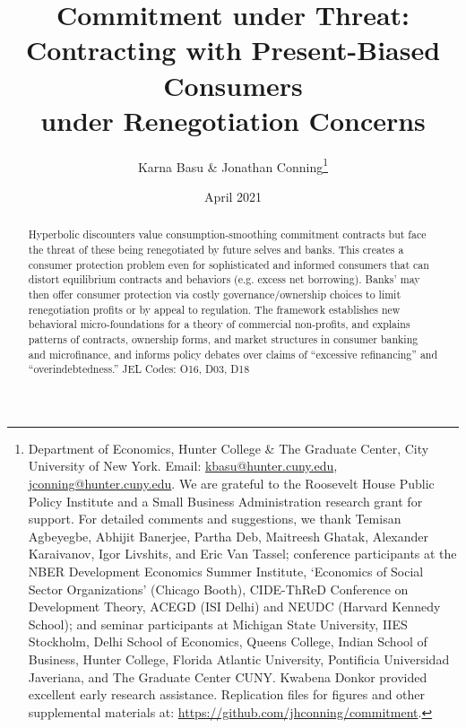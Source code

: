 \documentclass[11pt,english]{article}
\date{April 2021}\usepackage{babel}
\theoremstyle{plain}
\theoremstyle{definition}
\begin{document}
\title{Commitment under Threat:\\
Contracting with Present-Biased Consumers \\
under Renegotiation Concerns}

\author{Karna Basu \& Jonathan Conning\thanks{Department of Economics, Hunter College \& The Graduate Center, City
University of New York. Email: \href{mailto:kbasu@hunter.cuny.edu}{kbasu@hunter.cuny.edu}, \href{mailto:jconning@hunter.cuny.edu}{jconning@hunter.cuny.edu}.
We are grateful to the Roosevelt House Public Policy Institute and
a Small Business Administration research grant for support. For detailed
comments and suggestions, we thank Temisan Agbeyegbe, Abhijit Banerjee,
Partha Deb, Maitreesh Ghatak, Alexander Karaivanov, Igor Livshits,
and Eric Van Tassel; conference participants at the NBER Development
Economics Summer Institute, `Economics of Social Sector Organizations'
(Chicago Booth), CIDE-ThReD Conference on Development Theory, ACEGD
(ISI Delhi) and NEUDC (Harvard Kennedy School); and seminar participants
at Michigan State University, IIES Stockholm, Delhi School of Economics,
Queens College, Indian School of Business, Hunter College, Florida
Atlantic University, Pontificia Universidad Javeriana, and The Graduate
Center CUNY. Kwabena Donkor provided excellent early research assistance.
Replication files for figures and other supplemental materials at:
\protect\url{https://github.com/jhconning/commitment}.}}


\begin{abstract}
Hyperbolic discounters value consumption-smoothing commitment contracts
but face the threat of these being renegotiated by future selves and banks. This creates a consumer protection problem even for sophisticated and informed
consumers that can distort equilibrium contracts and behaviors (e.g.
excess net borrowing). Banks' may then offer
consumer protection via costly governance/ownership
choices to limit renegotiation profits or by appeal to regulation. The framework establishes
new behavioral micro-foundations for a theory of commercial non-profits, and explains
 patterns of contracts,  ownership forms, and market structures in consumer
banking and microfinance, and informs policy debates over claims of ``{}excessive
refinancing'' and ``overindebtedness.''{}  JEL Codes: O16, D03,
D18 
\end{abstract}

\maketitle
\end{document}
